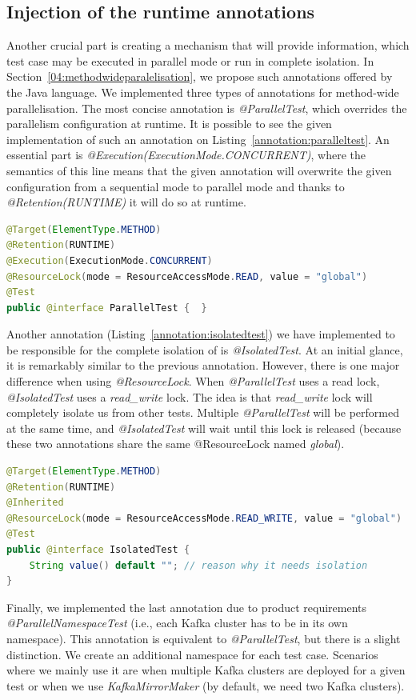 \subsection{Injection of the runtime annotations}
\label{05:sub:sec:annotations}

Another crucial part is creating a mechanism that will provide information, which test case may be executed in parallel
mode or run in complete isolation.
In Section~\ref{04:methodwideparalelisation}, we propose such annotations offered by the Java language.
We implemented three types of annotations for method-wide parallelisation.
The most concise annotation is \emph{@ParallelTest}, which overrides the parallelism configuration at runtime.
It is possible to see the given implementation of such an annotation on Listing~\ref{annotation:paralleltest}.
An essential part is \emph {@Execution(ExecutionMode.CONCURRENT)}, where the semantics of this line means that the given
annotation will overwrite the given configuration from a sequential mode to parallel mode and thanks to \emph {@Retention(RUNTIME)} it will do so at runtime.

\begin{lstlisting}[language=Java,label=annotation:paralleltest,caption=Implementation of the @ParallelTest annotation,frame=tb]
@Target(ElementType.METHOD)
@Retention(RUNTIME)
@Execution(ExecutionMode.CONCURRENT)
@ResourceLock(mode = ResourceAccessMode.READ, value = "global")
@Test
public @interface ParallelTest {  }
\end{lstlisting}
Another annotation (Listing~\ref{annotation:isolatedtest}) we have implemented to be responsible for the complete isolation of is \emph{@IsolatedTest}.
At an initial glance, it is remarkably similar to the previous annotation.
However, there is one major difference when using \emph{@ResourceLock}.
When \emph {@ParallelTest} uses a read lock, \emph{@IsolatedTest} uses a \emph{read\_write} lock.
The idea is that \emph{read\_write} lock will completely isolate us from other tests.
Multiple \emph{@ParallelTest} will be performed at the same time, and \emph{@IsolatedTest} will wait until this lock is
released (because these two annotations share the same @ResourceLock named \emph{global}).

\begin{lstlisting}[language=Java,label=annotation:isolatedtest,caption=Implementation of the @IsolatedTest annotation,frame=tb]
@Target(ElementType.METHOD)
@Retention(RUNTIME)
@Inherited
@ResourceLock(mode = ResourceAccessMode.READ_WRITE, value = "global")
@Test
public @interface IsolatedTest {
    String value() default ""; // reason why it needs isolation
}
\end{lstlisting}
Finally, we implemented the last annotation due to product requirements \emph{@ParallelNamespaceTest} (i.e., each Kafka cluster
has to be in its own namespace).
This annotation is equivalent to \emph{@ParallelTest}, but there is a slight distinction.
We create an additional namespace for each test case.
Scenarios where we mainly use it are when multiple Kafka clusters are deployed for a given test or when we use
\emph{KafkaMirrorMaker} (by default, we need two Kafka clusters).

